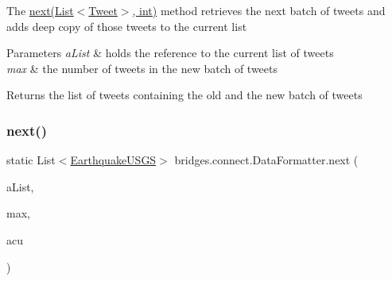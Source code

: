 The \hyperlink{classbridges_1_1connect_1_1_data_formatter_a3d0b2d2e0384d2a537bb61fbeb3d00a4}{next(\+List$<$\+Tweet$>$, int)} method retrieves the next batch of tweets and adds deep copy of those tweets to the current list 
\begin{DoxyParams}{Parameters}
{\em a\+List} & holds the reference to the current list of tweets \\
\hline
{\em max} & the number of tweets in the new batch of tweets \\
\hline
\end{DoxyParams}
\begin{DoxyReturn}{Returns}
the list of tweets containing the old and the new batch of tweets 
\end{DoxyReturn}
\mbox{\label{classbridges_1_1connect_1_1_data_formatter_ad451dd96b927702127d383e85fc98661}} 
\subsubsection{\texorpdfstring{next()}{next()}\hspace{0.1cm}{\footnotesize\ttfamily [2/2]}}
{\footnotesize\ttfamily static List$<$\hyperlink{classbridges_1_1data__src__dependent_1_1_earthquake_u_s_g_s}{Earthquake\+U\+S\+GS}$>$ bridges.\+connect.\+Data\+Formatter.\+next (\begin{DoxyParamCaption}\item[{List$<$ \hyperlink{classbridges_1_1data__src__dependent_1_1_earthquake_u_s_g_s}{Earthquake\+U\+S\+GS} $>$}]{a\+List,  }\item[{int}]{max,  }\item[{\hyperlink{classbridges_1_1data__src__dependent_1_1_u_s_g_saccount}{U\+S\+G\+Saccount}}]{acu }\end{DoxyParamCaption})\hspace{0.3cm}{\ttfamily [static]}}

